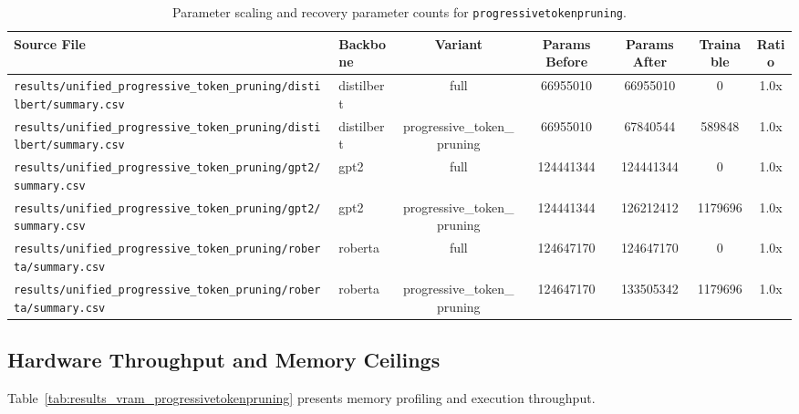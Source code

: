 \begin{table}[t]
\centering
\small
\begin{tabular}{llccccc}
\toprule
\textbf{Source File} & \textbf{Backbone} & \textbf{Variant} & \textbf{Params Before} & \textbf{Params After} & \textbf{Trainable} & \textbf{Ratio} \\
\midrule
\texttt{results/unified\_progressive\_token\_pruning/distilbert/summary.csv} & distilbert & full & 66955010 & 66955010 & 0 & 1.0x \\
\texttt{results/unified\_progressive\_token\_pruning/distilbert/summary.csv} & distilbert & progressive\_token\_pruning & 66955010 & 67840544 & 589848 & 1.0x \\
\texttt{results/unified\_progressive\_token\_pruning/gpt2/summary.csv} & gpt2 & full & 124441344 & 124441344 & 0 & 1.0x \\
\texttt{results/unified\_progressive\_token\_pruning/gpt2/summary.csv} & gpt2 & progressive\_token\_pruning & 124441344 & 126212412 & 1179696 & 1.0x \\
\texttt{results/unified\_progressive\_token\_pruning/roberta/summary.csv} & roberta & full & 124647170 & 124647170 & 0 & 1.0x \\
\texttt{results/unified\_progressive\_token\_pruning/roberta/summary.csv} & roberta & progressive\_token\_pruning & 124647170 & 133505342 & 1179696 & 1.0x \\
\bottomrule
\end{tabular}
\caption{Parameter scaling and recovery parameter counts for \texttt{progressivetokenpruning}.}
\label{tab:results_params_progressivetokenpruning}
\end{table}

\subsection{Hardware Throughput and Memory Ceilings}
Table~\ref{tab:results_vram_progressivetokenpruning} presents memory profiling and execution throughput.

